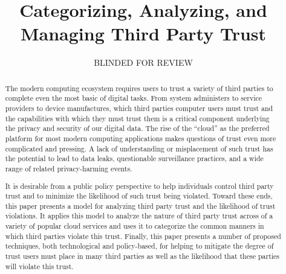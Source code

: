 \documentclass[11pt,letterpaper]{article}
\begin{document}
\title{Categorizing, Analyzing, and Managing Third Party Trust}

\author{BLINDED FOR REVIEW}

\date{}

\maketitle

\begin{abstract}

The modern computing ecosystem requires users to trust a variety of
third parties to complete even the most basic of digital tasks.  From
system administers to service providers to device manufactures, which
third parties computer users must trust and the capabilities with
which they must trust them is a critical component underlying the
privacy and security of our digital data. The rise of the ``cloud'' as
the preferred platform for most modern computing applications makes
questions of trust even more complicated and pressing. A lack of
understanding or misplacement of such trust has the potential to lead
to data leaks, questionable surveillance practices, and a wide range
of related privacy-harming events.

It is desirable from a public policy perspective to help individuals
control third party trust and to minimize the likelihood of such trust
being violated.  Toward these ends, this paper presents a model for
analyzing third party trust and the likelihood of trust violations. It
applies this model to analyze the nature of third party trust across
of a variety of popular cloud services and uses it to categorize the
common manners in which third parties violate this trust. Finally,
this paper presents a number of proposed techniques, both
technological and policy-based, for helping to mitigate the degree of
trust users must place in many third parties as well as the likelihood
that these parties will violate this trust.

\end{abstract}









\end{document}
